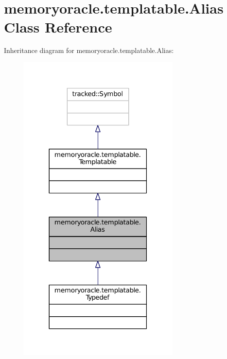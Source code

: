 \hypertarget{classmemoryoracle_1_1templatable_1_1Alias}{}\section{memoryoracle.\+templatable.\+Alias Class Reference}
\label{classmemoryoracle_1_1templatable_1_1Alias}


Inheritance diagram for memoryoracle.\+templatable.\+Alias\+:\nopagebreak
\begin{figure}[H]
\begin{center}
\leavevmode
\includegraphics[width=230pt]{classmemoryoracle_1_1templatable_1_1Alias__inherit__graph}
\end{center}
\end{figure}


